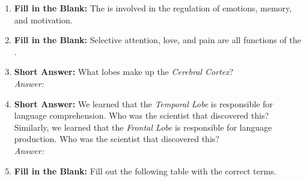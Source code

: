 \begin{enumerate}[label=\textbf{Q1.10.\arabic*}]
      \item \textbf{Fill in the Blank:} The \underline{\hspace{3cm}} is involved in the regulation of emotions, memory, and motivation. \\

      \item \textbf{Fill in the Blank:} Selective attention, love, and pain are all functions of the \underline{\hspace{3cm}}. \\

      \item \textbf{Short Answer:} What lobes make up the \textit{Cerebral Cortex}? \\
            \textit{Answer:} \\%

      \item \textbf{Short Answer:} We learned that the \textit{Temporal Lobe} is responsible for language comprehension. Who was the scientist that discovered this? Similarly, we learned that the \textit{Frontal Lobe} is responsible for language production. Who was the scientist that discovered this? \\
            \textit{Answer:} \\%



\newpage
      \item \textbf{Fill in the Blank:} Fill out the following table with the correct terms.
\end{enumerate}

